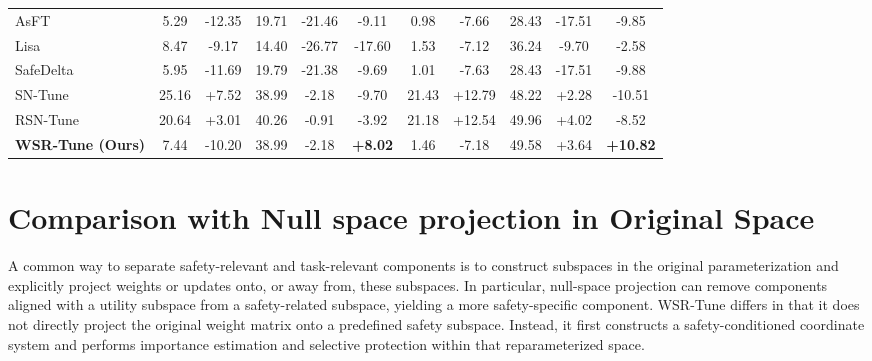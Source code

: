 \documentclass{article}
\newcommand{\kms}[1]{{\leavevmode\color{blue}[MS: #1]}}
\newcommand{\wjb}[1]{{\leavevmode\color{orange}[jb: #1]}}
\begin{document}
\begin{table}[t]
{\begin{tabular}{lccccc|ccccc}
AsFT
& 5.29 & -12.35 & 19.71 & -21.46 & -9.11
& 0.98 & -7.66 & 28.43 & -17.51 & -9.85 \\

Lisa
& 8.47 & -9.17 & 14.40 & -26.77 & -17.60
& 1.53 & -7.12 & 36.24 & -9.70 & -2.58 \\

SafeDelta
& 5.95 & -11.69 & 19.79 & -21.38 & -9.69
& 1.01 & -7.63 & 28.43 & -17.51 & -9.88 \\

SN-Tune
& 25.16 & +7.52 & 38.99 & -2.18 & -9.70
& 21.43 & +12.79 & 48.22 & +2.28 & -10.51 \\

RSN-Tune
& 20.64 & +3.01 & 40.26 & -0.91 & -3.92
& 21.18 & +12.54 & 49.96 & +4.02 & -8.52 \\



\textbf{WSR-Tune (Ours)}
& 7.44 & -10.20 & 38.99 & -2.18 & \cellcolor{green!20}\textbf{+8.02}
& 1.46 & -7.18 & 49.58 & +3.64 & \cellcolor{green!20}\textbf{+10.82} \\

\bottomrule
\end{tabular}
}
\vspace{-3mm}
\end{table}









\section{Comparison with Null space projection in Original Space}
\label{app:actsved}



A common way to separate safety-relevant and task-relevant components is to construct subspaces in the original parameterization and explicitly project weights or updates onto, or away from, these subspaces. In particular, null-space projection can remove components aligned with a utility subspace from a safety-related subspace, yielding a more safety-specific component. WSR-Tune differs in that it does not directly project the original weight matrix onto a predefined safety subspace. Instead, it first constructs a safety-conditioned coordinate system and performs importance estimation and selective protection within that reparameterized space.
\end{document}
